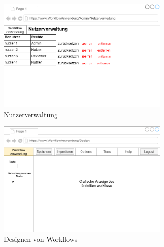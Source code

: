 \begin{figure}[ht]
 \centering
 \includegraphics[width = 0.75\textwidth]{Grafiken/nutzerverwaltungGui.drawio.png}
 \caption{Nutzerverwaltung}
 \label{fig:Abb 3}
\end{figure}

\begin{figure}[ht]
 \centering
 \includegraphics[width = 0.75\textwidth]{Grafiken/workflowDesignGui.drawio.png}
 \caption{Designen von Workflows}
 \label{fig:Abb 4}
\end{figure}
